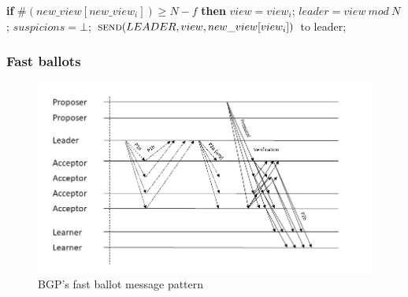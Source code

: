 \begin{algorithm}
\begin{algorithmic}[1]
		\State
		\State\hspace{\algorithmicindent} \textbf{if} $\#(new\_view[new\_view_i]) \geq N-f$ \textbf{then}
		\State\hspace{\algorithmicindent}\hspace{\algorithmicindent} $view = view_i$;
		\State\hspace{\algorithmicindent}\hspace{\algorithmicindent} $leader = view\ mod\ N$;
		\State\hspace{\algorithmicindent}\hspace{\algorithmicindent} $suspicions = \bot$;
		\State\hspace{\algorithmicindent}\hspace{\algorithmicindent} $\Call{send}{LEADER, view, new\_view[view_i]}$ to leader;
	\end{algorithmic}
\end{algorithm}

\subsubsection{Fast ballots} 

\begin{figure}
	\centering
	\includegraphics[width=\textwidth*2/3]{Figures/bgp_fast}
	\caption{BGP's fast ballot message pattern}
	\label{bgp_fast}
\end{figure}

